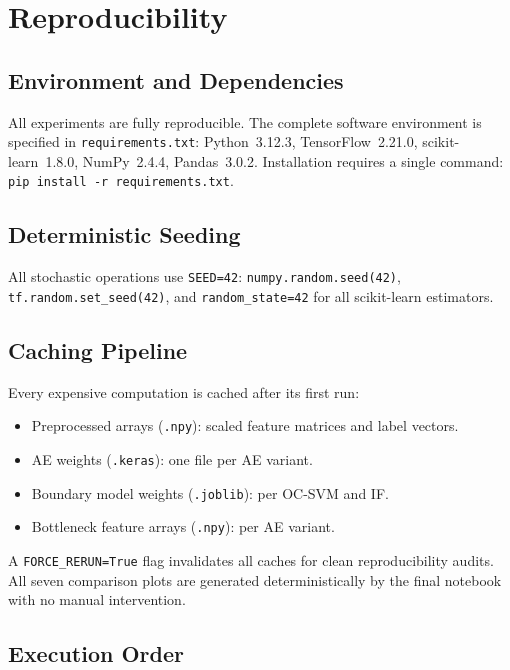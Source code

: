 \documentclass[10pt,journal,compsoc]{IEEEtran}
\begin{document}
\section{Reproducibility}
\label{sec:repro}

\subsection{Environment and Dependencies}

All experiments are fully reproducible.  The complete software
environment is specified in \texttt{requirements.txt}:
Python~3.12.3, TensorFlow~2.21.0, scikit-learn~1.8.0, NumPy~2.4.4,
Pandas~3.0.2.  Installation requires a single command:
\texttt{pip install -r requirements.txt}.

\subsection{Deterministic Seeding}

All stochastic operations use \texttt{SEED=42}:
\texttt{numpy.random.seed(42)}, \texttt{tf.random.set\_seed(42)},
and \texttt{random\_state=42} for all scikit-learn estimators.

\subsection{Caching Pipeline}

Every expensive computation is cached after its first run:
\begin{itemize}[leftmargin=*,noitemsep]
  \item Preprocessed arrays (\texttt{.npy}): scaled feature matrices
        and label vectors.
  \item AE weights (\texttt{.keras}): one file per AE variant.
  \item Boundary model weights (\texttt{.joblib}): per OC-SVM and IF.
  \item Bottleneck feature arrays (\texttt{.npy}): per AE variant.
\end{itemize}
A \texttt{FORCE\_RERUN=True} flag invalidates all caches for clean
reproducibility audits.  All seven comparison plots are generated
deterministically by the final notebook with no manual intervention.

\subsection{Execution Order}
\end{document}
